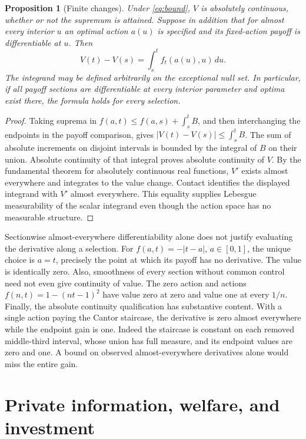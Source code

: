 \documentclass[11pt]{article}
\newtheorem{proposition}{Proposition}
\begin{document}
\begin{proposition}[Finite changes]
Under \eqref{eq:bound}, \(V\) is absolutely continuous, whether or not the supremum is attained. Suppose in addition that for almost every interior \(u\) an optimal action \(a(u)\) is specified and its fixed-action payoff is differentiable at \(u\). Then
\begin{equation}
 V(t)-V(s)=\int_s^t f_t(a(u),u)\,du.                \label{eq:int}
\end{equation}
The integrand may be defined arbitrarily on the exceptional null set. In particular, if all payoff sections are differentiable at every interior parameter and optima exist there, the formula holds for every selection.
\end{proposition}
\begin{proof}
Taking suprema in \(f(a,t)\leq f(a,s)+\int_s^t B\), and then interchanging the endpoints in the payoff comparison, gives \(|V(t)-V(s)|\leq\int_s^t B\). The sum of absolute increments on disjoint intervals is bounded by the integral of \(B\) on their union. Absolute continuity of that integral proves absolute continuity of \(V\). By the fundamental theorem for absolutely continuous real functions, \(V'\) exists almost everywhere and integrates to the value change. Contact identifies the displayed integrand with \(V'\) almost everywhere. This equality supplies Lebesgue measurability of the scalar integrand even though the action space has no measurable structure.
\end{proof}

Sectionwise almost-everywhere differentiability alone does not justify evaluating the derivative along a selection. For \(f(a,t)=-|t-a|\), \(a\in[0,1]\), the unique choice is \(a=t\), precisely the point at which its payoff has no derivative. The value is identically zero. Also, smoothness of every section without common control need not even give continuity of value. The zero action and actions \(f(n,t)=1-(nt-1)^2\) have value zero at zero and value one at every \(1/n\). Finally, the absolute continuity qualification has substantive content. With a single action paying the Cantor staircase, the derivative is zero almost everywhere while the endpoint gain is one. Indeed the staircase is constant on each removed middle-third interval, whose union has full measure, and its endpoint values are zero and one. A bound on observed almost-everywhere derivatives alone would miss the entire gain.

\section{Private information, welfare, and investment}
\end{document}

